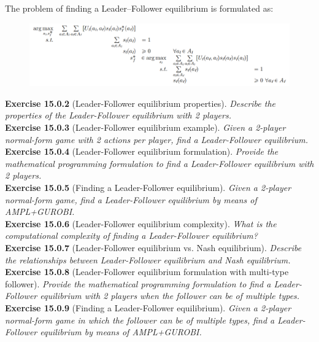 The problem of finding a Leader–Follower equilibrium is formulated as:
\begin{figure}[H]
\centering
\includegraphics[width=\textwidth]{images/img_3_15_01.png}
\end{figure}

\textbf{Exercise 15.0.2} (Leader-Follower equilibrium properties). \textit{Describe the properties of the Leader-Follower equilibrium with 2 players.}\\

\textbf{Exercise 15.0.3} (Leader-Follower equilibrium example). \textit{Given a 2-player normal-form game with 2 actions per player, find a Leader-Follower equilibrium.}\\

\textbf{Exercise 15.0.4} (Leader-Follower equilibrium formulation). \textit{Provide the mathematical programming formulation to find a Leader-Follower equilibrium with 2 players.}\\

\textbf{Exercise 15.0.5} (Finding a Leader-Follower equilibrium). \textit{Given a 2-player normal-form game, find a Leader-Follower equilibrium by means of AMPL+GUROBI.}\\

\textbf{Exercise 15.0.6} (Leader-Follower equilibrium complexity). \textit{What is the computational complexity of finding a Leader-Follower equilibrium?}\\

\textbf{Exercise 15.0.7} (Leader-Follower equilibrium vs.  Nash equilibrium). \textit{Describe the relationships between Leader-Follower equilibrium and Nash equilibrium.}\\

\textbf{Exercise 15.0.8} (Leader-Follower equilibrium formulation with multi-type follower). \textit{Provide the mathematical programming formulation to find a Leader-Follower equilibrium with 2 players when the follower can be of multiple types.}\\

\textbf{Exercise 15.0.9} (Finding a Leader-Follower equilibrium). \textit{Given a 2-player normal-form game in which the follower can be of multiple types, find a Leader-Follower equilibrium by means of AMPL+GUROBI.}\\

